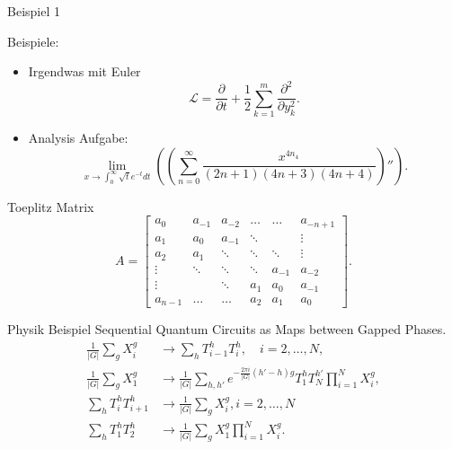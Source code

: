 \documentclass{beamer}
\begin{document}
\begin{frame}{Beispiel 1}


Beispiele:
\begin{itemize}
    \item Irgendwas mit Euler \cite{baranek2023randomized}
        \[ \mathcal{L} = \frac{\partial}{\partial t}+ \frac{1}{2}\sum_{k=1}^{m}\frac{\partial^2}{\partial y_{k}^2} .\] 
\end{itemize}


\begin{itemize}
    \item Analysis Aufgabe: 
        \[ \lim_{x\to \int_0^{\infty} \sqrt{t}e^{-t}dt}\left( \left( \sum_{n=0}^{\infty}\frac{x^{4n_4}}{(2n+1)(4n+3)(4n+4)} \right)''  \right) .\] 
\end{itemize}
\end{frame}

    



\begin{frame}{Toeplitz Matrix}
    \[ A=\begin{bmatrix}
            a_0 & a_{-1} & a_{-2} & \ldots & \ldots  &a_{-n+1}  \\
            a_1 & a_0  & a_{-1} &  \ddots   &  &  \vdots \\
            a_2 & a_1 & \ddots  & \ddots & \ddots& \vdots \\ 
            \vdots &  \ddots & \ddots &   \ddots  & a_{-1} & a_{-2}\\
            \vdots &         & \ddots & a_1 & a_0 &  a_{-1} \\
            a_{n-1} &  \ldots & \ldots & a_2 & a_1 & a_0
        \end{bmatrix} .\] 
\end{frame}



\begin{frame}{Physik Beispiel}
    Sequential Quantum Circuits as Maps between Gapped Phases.\cite{chen2023sequential}
    \begin{align*}
        \frac{1}{|G|}\sum_g X^g_i &\to \sum_h T^h_{i-1}T^h_i, \quad i=2,\ldots,N,  \\
        \frac{1}{|G|} \sum_g X_1^g &\to \frac{1}{|G|} \sum_{h,h'}e^{-\frac{2\pi i}{|G|}(h'-h)g}T_1^hT^{h'}_N \prod^N_{i=1}X_i^g,  \\
        \sum_h T^h_i T^h_{i+1} &\to \frac{1}{|G|} \sum_g X_i^g, i=2,\ldots,N  \\
        \sum_h T^h_1 T^h_2 &\to \frac{1}{|G|} \sum_g X_1^g \prod_{i=1}^N X_i^g.
    \end{align*}
\end{frame}
\end{document}
